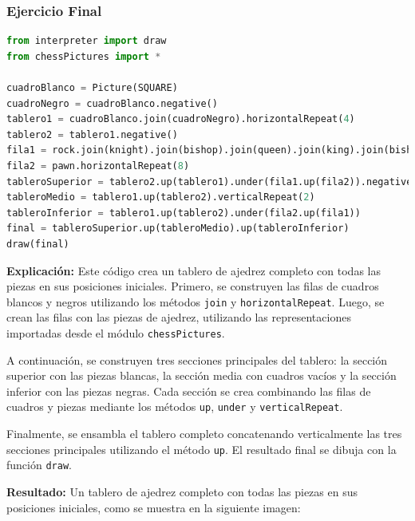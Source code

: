 \documentclass{article}
\begin{document}
\begin{itemize}
\subsubsection{Ejercicio Final}

\begin{lstlisting}[language=Python, caption={Código del ejercicio final}]
from interpreter import draw
from chessPictures import *

cuadroBlanco = Picture(SQUARE)
cuadroNegro = cuadroBlanco.negative()
tablero1 = cuadroBlanco.join(cuadroNegro).horizontalRepeat(4)
tablero2 = tablero1.negative()
fila1 = rock.join(knight).join(bishop).join(queen).join(king).join(bishop).join(knight).join(rock)
fila2 = pawn.horizontalRepeat(8)
tableroSuperior = tablero2.up(tablero1).under(fila1.up(fila2)).negative()
tableroMedio = tablero1.up(tablero2).verticalRepeat(2)
tableroInferior = tablero1.up(tablero2).under(fila2.up(fila1))
final = tableroSuperior.up(tableroMedio).up(tableroInferior)
draw(final)
\end{lstlisting}

\textbf{Explicación:}
Este código crea un tablero de ajedrez completo con todas las piezas en sus posiciones iniciales. Primero, se construyen las filas de cuadros blancos y negros utilizando los métodos \texttt{join} y \texttt{horizontalRepeat}. Luego, se crean las filas con las piezas de ajedrez, utilizando las representaciones importadas desde el módulo \texttt{chessPictures}.

A continuación, se construyen tres secciones principales del tablero: la sección superior con las piezas blancas, la sección media con cuadros vacíos y la sección inferior con las piezas negras. Cada sección se crea combinando las filas de cuadros y piezas mediante los métodos \texttt{up}, \texttt{under} y \texttt{verticalRepeat}.

Finalmente, se ensambla el tablero completo concatenando verticalmente las tres secciones principales utilizando el método \texttt{up}. El resultado final se dibuja con la función \texttt{draw}.

\textbf{Resultado:}
Un tablero de ajedrez completo con todas las piezas en sus posiciones iniciales, como se muestra en la siguiente imagen:


\end{itemize}
\end{document}
